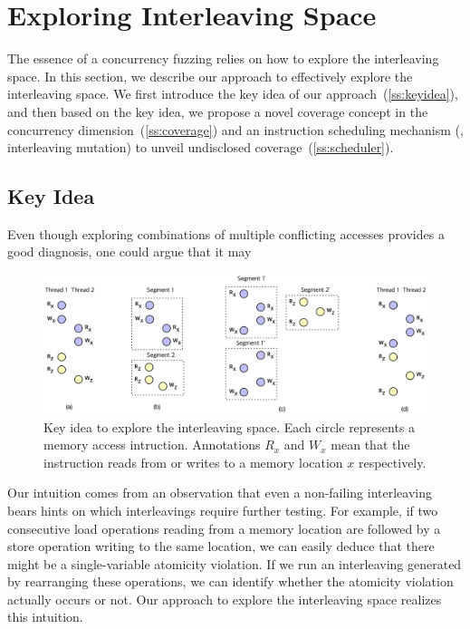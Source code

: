 \section{Exploring Interleaving Space}
\label{s:design}

\newcommand{\segment}{segment graph\xspace}
\newcommand{\segments}{segment graphs\xspace}
\newcommand{\Segments}{Segment graphs\xspace}

\newcommand{\mutable}{mutable edge\xspace}
\newcommand{\mutables}{mutable edges\xspace}
\newcommand{\immutable}{immutable edge\xspace}
\newcommand{\immutables}{immutable edges\xspace}


The essence of a concurrency fuzzing relies on how to explore the
interleaving space.
%
In this section, we describe our approach to effectively explore the
interleaving space.
%
We first introduce the key idea of our
approach~(\autoref{ss:keyidea}), and then based on the key idea, we
propose a novel coverage concept in the concurrency
dimension~(\autoref{ss:coverage}) and an instruction scheduling
mechanism (\ie, interleaving mutation) to unveil undisclosed
coverage~(\autoref{ss:scheduler}).

\subsection{Key Idea}
\label{ss:keyidea}

%
Even though exploring combinations of multiple conflicting accesses
provides a good diagnosis, one could argue that it may 


\begin{figure}[t]
  \includegraphics[width=0.9\linewidth]{fig/intuition.pdf}
  \caption{Key idea to explore the interleaving space. Each circle
    represents a memory access intruction. Annotations $R_x$ and $W_x$
    mean that the instruction reads from or writes to a memory
    location $x$ respectively.}
  \label{fig:intuition}
\end{figure}

Our intuition comes from an observation that even a non-failing
interleaving bears hints on which interleavings require further
testing.
%
For example, if two consecutive load operations reading from a memory
location are followed by a store operation writing to the same
location, we can easily deduce that there might be a single-variable
atomicity violation.
%
If we run an interleaving generated by rearranging these operations,
we can identify whether the atomicity violation actually occurs or
not.
%
Our approach to explore the interleaving space realizes this
intuition.



